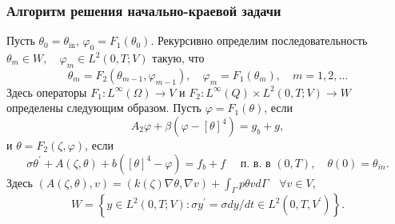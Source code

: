 \begin{frame}
    \frametitle{Алгоритм решения начально-краевой задачи}
    Пусть $\theta_{0}=\theta_{\text{in}}, \, \varphi_{0}=F_{1}\left(\theta_{0}\right)$.
    Рекурсивно определим последовательность
    $\theta_{m} \in W, \quad \varphi_{m} \in L^{2}(0, T ; V)$ такую, что
    \begin{equation}
        \label{eq:1_6:10}
        \theta_{m}=F_{2}\left(\theta_{m-1}, \varphi_{m-1}\right),
        \quad \varphi_{m}=F_{1}\left(\theta_{m}\right), \quad m=1,2, \ldots
    \end{equation}
    Здесь операторы $F_{1}: L^{\infty}(\Omega) \rightarrow V$ и
    $F_{2}: L^{\infty}(Q) \times L^{2}(0, T ; V) \rightarrow W$ определены следующим образом.
    Пусть $\varphi=F_{1}(\theta)$, если
    \begin{equation}
        \label{eq:1_6:6}
        A_{2} \varphi+\beta\left(\varphi-[\theta]^{4}\right)=g_{b}+g,
    \end{equation}
    и $\theta=F_{2}(\zeta, \varphi)$, если
    \begin{equation}
        \label{eq:1_6:7}
        \sigma \theta^{\prime}+A(\zeta, \theta)
        +b\left([\theta]^{4}-\varphi\right)=f_{b}+f
        \quad \text { п. в. в }(0, T), \quad \theta(0)=\theta_{i n}.
    \end{equation}
    Здесь
    $ (A(\zeta, \theta), v)=(k(\zeta) \nabla \theta, \nabla v) +\int_{\Gamma} p \theta v d \Gamma \quad \forall v \in V$,
    \[
        W=\left\{y \in L^{2}(0, T ; V): \sigma y^{\prime}=\sigma d y / d t \in L^{2}
        \left(0, T, V^{\prime}\right)\right\}.
    \]
\end{frame}

